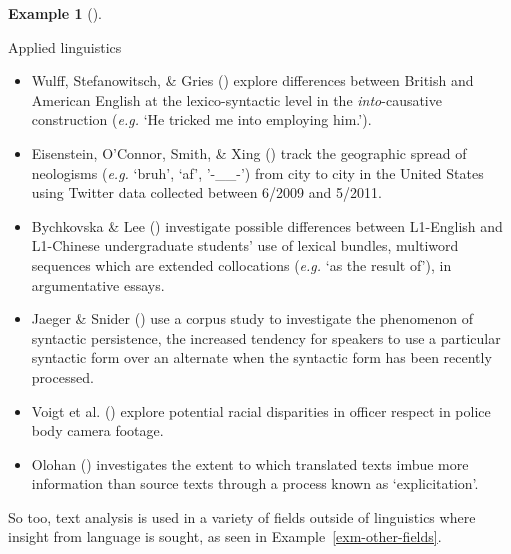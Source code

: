 \documentclass[
  letterpaper,
  krantz1]{latex/krantz-mod}
\providecommand{\tightlist}{%
  \setlength{\itemsep}{0pt}\setlength{\parskip}{0pt}}\usepackage{longtable,booktabs,array}
\theoremstyle{definition}
\theoremstyle{definition}
\newtheorem{example}{Example}[chapter]
\theoremstyle{remark}
\begin{document}
\begin{example}[]\protect\hypertarget{exm-linguistic-applied}{}\label{exm-linguistic-applied}

Applied linguistics

\begin{itemize}
\tightlist
\item
  Wulff, Stefanowitsch, \& Gries ()
  explore differences between British and American English at the
  lexico-syntactic level in the \emph{into}-causative construction
  (\emph{e.g.} `He tricked me into employing him.').
\item
  Eisenstein, O'Connor, Smith, \& Xing
  () track the geographic spread of
  neologisms (\emph{e.g.} `bruh', `af', '-\_\_-') from city to city in
  the United States using Twitter data collected between 6/2009 and
  5/2011.
\item
  Bychkovska \& Lee () investigate
  possible differences between L1-English and L1-Chinese undergraduate
  students' use of lexical bundles, multiword sequences which are
  extended collocations (\emph{e.g.} `as the result of'), in
  argumentative essays.
\item
  Jaeger \& Snider () use a corpus study
  to investigate the phenomenon of syntactic persistence, the increased
  tendency for speakers to use a particular syntactic form over an
  alternate when the syntactic form has been recently processed.
\item
  Voigt et al. () explore potential racial
  disparities in officer respect in police body camera footage.
\item
  Olohan () investigates the extent to
  which translated texts imbue more information than source texts
  through a process known as `explicitation'.
\end{itemize}

\end{example}

So too, text analysis is used in a variety of fields outside of
linguistics where insight from language is sought, as seen in
Example~\ref{exm-other-fields}.
\end{document}

